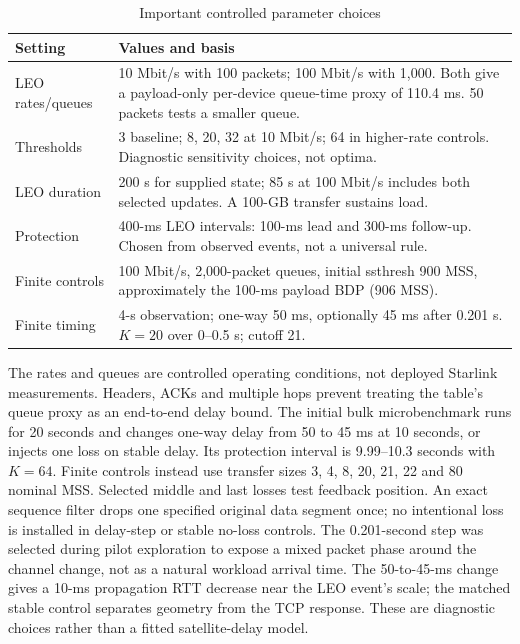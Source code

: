 \documentclass[conference]{IEEEtran}
\begin{document}
\begin{table}[t]
\caption{Important controlled parameter choices}
\label{tab:params}
\centering
\begin{tabular}{p{0.98in}p{2.17in}}
\toprule
Setting & Values and basis\\
\midrule
LEO rates/queues &
10 Mbit/s with 100 packets; 100 Mbit/s with 1,000.
Both give a payload-only per-device queue-time proxy of 110.4 ms.
50 packets tests a smaller queue.\\
Thresholds &
3 baseline; 8, 20, 32 at 10 Mbit/s; 64 in higher-rate
controls. Diagnostic sensitivity choices, not optima.\\
LEO duration &
200 s for supplied state; 85 s at 100 Mbit/s includes
both selected updates. A 100-GB transfer sustains load.\\
Protection &
400-ms LEO intervals: 100-ms lead and 300-ms follow-up.
Chosen from observed events, not a universal rule.\\
Finite controls &
100 Mbit/s, 2,000-packet queues, initial ssthresh 900 MSS,
approximately the 100-ms payload BDP (906 MSS).\\
Finite timing &
4-s observation; one-way 50 ms, optionally 45 ms after
0.201 s. $K=20$ over 0--0.5 s; cutoff 21.\\
\bottomrule
\end{tabular}
\end{table}

The rates and queues are controlled operating conditions, not deployed
Starlink measurements. Headers, ACKs and multiple hops prevent treating
the table's queue proxy as an end-to-end delay bound. The initial bulk
microbenchmark runs for 20 seconds and changes one-way delay from
50 to 45 ms at 10 seconds, or injects one loss on stable delay.
Its protection interval is 9.99--10.3 seconds with $K=64$.
Finite controls instead use transfer sizes 3, 4, 8, 20, 21, 22 and
80 nominal MSS. Selected middle and last losses test feedback position.
An exact sequence filter drops one specified original data segment once;
no intentional loss is installed in delay-step or stable no-loss controls.
The 0.201-second step was selected during pilot exploration to expose a
mixed packet phase around the channel change, not as a natural workload
arrival time. The 50-to-45-ms change gives a 10-ms propagation RTT decrease
near the LEO event's scale; the matched stable control separates geometry
from the TCP response. These are diagnostic choices rather than a fitted
satellite-delay model.
\end{document}
